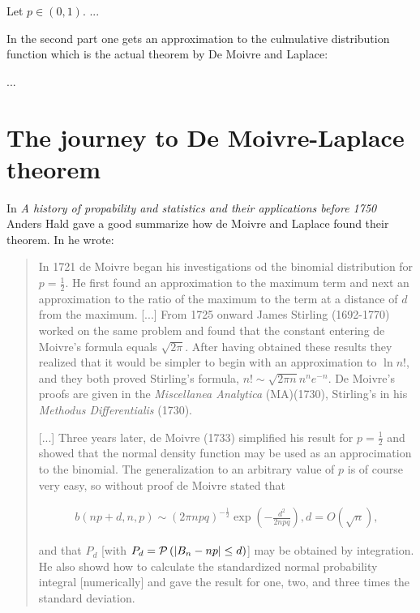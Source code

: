 \begin{theorem}
  Let $p\in(0,1)$. ...
\end{theorem}

In the second part one gets an approximation to the culmulative distribution function which is the actual theorem by De Moivre and Laplace:

\begin{theorem}
  ...
\end{theorem}

\section{The journey to De Moivre-Laplace theorem}

In \emph{A history of propability and statistics and their applications before 1750} Anders Hald gave a good summarize how de Moivre and Laplace found their theorem. In \cite[pp. 469-470]{hald1} he wrote:

\begin{quotation}
  In 1721 de Moivre began his investigations od the binomial distribution for $p=\tfrac 12$. He first found an approximation to the maximum term and next an approximation to the ratio of the maximum to the term at a distance of $d$ from the maximum. [...] From 1725 onward James Stirling (1692-1770) worked on the same problem and found that the constant entering de Moivre's formula equals $\sqrt{2\pi}$. After having obtained these results they realized that it would be simpler to begin with an approximation to $\ln n!$, and they both proved Stirling's formula, $n! \sim \sqrt{2\pi n}n^ne^{-n}$. De Moivre's proofs are given in the \emph{Miscellanea Analytica} (MA)(1730), Stirling's in his \emph{Methodus Differentialis} (1730).

  [...] Three years later, de Moivre (1733) simplified his result for $p=\tfrac 12$ and showed that the normal density function may be used as an approcimation to the binomial. The generalization to an arbitrary value of $p$ is of course very easy, so without proof de Moivre stated that

  \begin{align*}
      b(np+d,n,p) \sim (2\pi npq)^{-\tfrac 12} \exp\left( -\frac{d^2}{2npq} \right), d = O(\sqrt n),
  \end{align*}

  and that $P_d$ [with $P_d=\mathcal P\left({|B_{n} -np|\le d}\right)$] may be obtained by integration. He also showd how to calculate the standardized normal probability integral [numerically] and gave the result for one, two, and three times the standard deviation.
\end{quotation}

